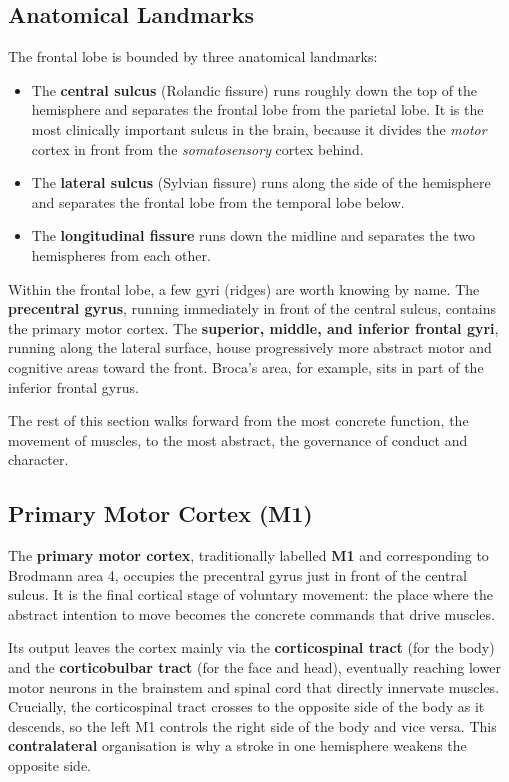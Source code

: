 \documentclass[11pt]{article}
\begin{document}
\subsection{Anatomical Landmarks}

The frontal lobe is bounded by three anatomical landmarks:

\begin{itemize}
    \item The \textbf{central sulcus} (Rolandic fissure) runs roughly down the top of the hemisphere and separates the frontal lobe from the parietal lobe. It is the most clinically important sulcus in the brain, because it divides the \textit{motor} cortex in front from the \textit{somatosensory} cortex behind.
    \item The \textbf{lateral sulcus} (Sylvian fissure) runs along the side of the hemisphere and separates the frontal lobe from the temporal lobe below.
    \item The \textbf{longitudinal fissure} runs down the midline and separates the two hemispheres from each other.
\end{itemize}

Within the frontal lobe, a few gyri (ridges) are worth knowing by name. The \textbf{precentral gyrus}, running immediately in front of the central sulcus, contains the primary motor cortex. The \textbf{superior, middle, and inferior frontal gyri}, running along the lateral surface, house progressively more abstract motor and cognitive areas toward the front. Broca's area, for example, sits in part of the inferior frontal gyrus.

The rest of this section walks forward from the most concrete function, the movement of muscles, to the most abstract, the governance of conduct and character.

\subsection{Primary Motor Cortex (M1)}

The \textbf{primary motor cortex}, traditionally labelled \textbf{M1} and corresponding to Brodmann area 4, occupies the precentral gyrus just in front of the central sulcus. It is the final cortical stage of voluntary movement: the place where the abstract intention to move becomes the concrete commands that drive muscles.

Its output leaves the cortex mainly via the \textbf{corticospinal tract} (for the body) and the \textbf{corticobulbar tract} (for the face and head), eventually reaching lower motor neurons in the brainstem and spinal cord that directly innervate muscles. Crucially, the corticospinal tract crosses to the opposite side of the body as it descends, so the left M1 controls the right side of the body and vice versa. This \textbf{contralateral} organisation is why a stroke in one hemisphere weakens the opposite side.
\end{document}
